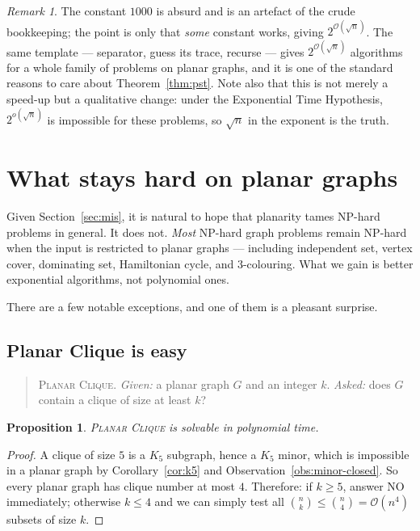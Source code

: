 \documentclass[11pt,a4paper]{article}
\theoremstyle{plain}
\newtheorem{proposition}[theorem]{Proposition}
\theoremstyle{definition}
\theoremstyle{remark}
\newtheorem{remark}[theorem]{Remark}
\newcommand{\bigoh}[1]{\mathcal{O}\!\left(#1\right)}
\begin{document}
\begin{remark}
The constant $1000$ is absurd and is an artefact of the crude bookkeeping; the
point is only that \emph{some} constant works, giving
$2^{\bigoh{\sqrt n}}$. The same template --- separator, guess its trace,
recurse --- gives $2^{\bigoh{\sqrt n}}$ algorithms for a whole family of
problems on planar graphs, and it is one of the standard reasons to care about
Theorem~\ref{thm:pst}. Note also that this is not merely a speed-up but a
qualitative change: under the Exponential Time Hypothesis, $2^{o(\sqrt n)}$ is
impossible for these problems, so $\sqrt n$ in the exponent is the truth.
\end{remark}

\section{What stays hard on planar graphs}\label{sec:hardness}

Given Section~\ref{sec:mis}, it is natural to hope that planarity tames NP-hard
problems in general. It does not. \emph{Most} NP-hard graph problems remain
NP-hard when the input is restricted to planar graphs --- including independent
set, vertex cover, dominating set, Hamiltonian cycle, and $3$-colouring. What
we gain is better exponential algorithms, not polynomial ones.

There are a few notable exceptions, and one of them is a pleasant surprise.

\subsection{Planar Clique is easy}

\begin{quote}
\textsc{Planar Clique.} \emph{Given:} a planar graph $G$ and an integer $k$.
\emph{Asked:} does $G$ contain a clique of size at least $k$?
\end{quote}

\begin{proposition}
\textsc{Planar Clique} is solvable in polynomial time.
\end{proposition}

\begin{proof}
A clique of size $5$ is a $K_5$ subgraph, hence a $K_5$ minor, which is
impossible in a planar graph by Corollary~\ref{cor:k5} and
Observation~\ref{obs:minor-closed}. So every planar graph has clique number at
most $4$. Therefore: if $k \ge 5$, answer NO immediately; otherwise
$k \le 4$ and we can simply test all $\binom{n}{k} \le \binom{n}{4} =
\bigoh{n^4}$ subsets of size $k$.
\end{proof}
\end{document}
